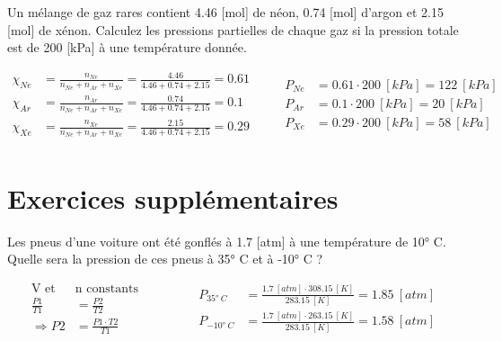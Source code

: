 \documentclass[
  11pt,
  a4paper,
  openany]{book}
\begin{document}
\begin{Exercise}

Un mélange de gaz rares contient 4.46 {[}mol{]} de néon, 0.74 {[}mol{]} d'argon et 2.15 {[}mol{]} de xénon. Calculez les pressions partielles de chaque gaz si la pression totale est de 200 {[}kPa{]} à une température donnée.


\end{Exercise}

\begin{Answer}
\[
\begin{split}
    \chi_{Ne} &= \frac{n_{Ne}}{n_{Ne}+n_{Ar}+n_{Xe}} = \frac{4.46}{4.46+0.74+2.15} = 0.61 \\
    \chi_{Ar} &= \frac{n_{Ar}}{n_{Ne}+n_{Ar}+n_{Xe}} = \frac{0.74}{4.46+0.74+2.15} = 0.1 \\
    \chi_{Xe} &= \frac{n_{Xe}}{n_{Ne}+n_{Ar}+n_{Xe}} = \frac{2.15}{4.46+0.74+2.15} = 0.29\\
\end{split}
\qquad
\begin{split}
    P_{Ne} &= 0.61 \cdot 200\ [kPa] = 122\ [kPa] \\
    P_{Ar} &= 0.1 \cdot 200\ [kPa] = 20\ [kPa] \\
    P_{Xe} &= 0.29 \cdot 200\ [kPa] = 58\ [kPa] \\
\end{split}
\]

\end{Answer}

\section{Exercices supplémentaires}\label{exercices-suppluxe9mentaires-11}

\begin{Exercise}

Les pneus d'une voiture ont été gonflés à 1.7 {[}atm{]} à une température de 10° C. Quelle sera la pression de ces pneus à 35° C et à -10° C ?


\end{Exercise}

\begin{Answer}
\[
\begin{split}
    \text{V et } & \text{n constants}\\
    \frac{P1}{T1} &= \frac{P2}{T2} \\
    \Rightarrow P2 &= \frac{P1 \cdot T2}{T1}
\end{split}
\qquad\qquad
\begin{split}
    P_{35°\ C} &= \frac{1.7\ [atm] \cdot 308.15\ [K]}{283.15\ [K]} = 1.85\ [atm] \\[1em]
    P_{-10°\ C} &= \frac{1.7\ [atm] \cdot 263.15\ [K]}{283.15\ [K]} = 1.58\ [atm]
\end{split}
\]

\end{Answer}
\end{document}

